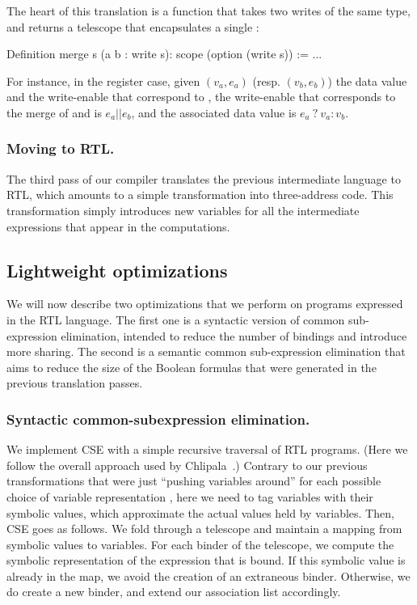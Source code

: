 \documentclass{llncs}
\begin{document}
The heart of this translation is a  function that takes
two writes of the same type, and returns a telescope that
encapsulates a single : 
\begin{mcoq}
Definition merge s (a b : write s): scope (option (write s)) := ...   
\end{mcoq}
%
For instance, in the register case, given $(v_a,e_a)$ (resp. $(v_b,
e_b)$) the data value and the write-enable that correspond to
, the write-enable that corresponds to the merge of 
and  is $e_a || e_b$, and the associated data value is
\mbox{$e_a~?~v_a : v_b$}.

\subsubsection{Moving to RTL.} The third pass of our compiler translates
the previous intermediate language to RTL, which amounts to a simple
transformation into three-address code. This transformation simply
introduces new variables for all the intermediate expressions that
appear in the computations. 

\subsection{Lightweight optimizations}
We will now describe two optimizations that we perform on programs
expressed in the RTL language. 
%
The first one is a syntactic version of common sub-expression
elimination, intended to reduce the number of bindings and introduce
more sharing. 
%
The second is a semantic common sub-expression elimination that aims
to reduce the size of the Boolean formulas that were generated in the
previous translation passes. 

\subsubsection{Syntactic common-subexpression elimination.}
We implement CSE with a simple recursive traversal of RTL
programs. (Here we follow the overall approach used by
Chlipala~\cite{DBLP:conf/popl/Chlipala10}.)
%
Contrary to our previous transformations that were just ``pushing
variables around'' for each possible choice of variable representation
, here we need to tag variables with their symbolic values,
which approximate the actual values held by variables.
% 
%
Then, CSE goes as follows. We fold through a telescope and maintain a
mapping from symbolic values to variables. For each binder of the
telescope, we compute the symbolic representation of the expression
that is bound. 
%
If this symbolic value is already in the map, we avoid the creation of
an extraneous binder. Otherwise, we do create a new binder, and extend
our association list accordingly. 
 
\end{document}
